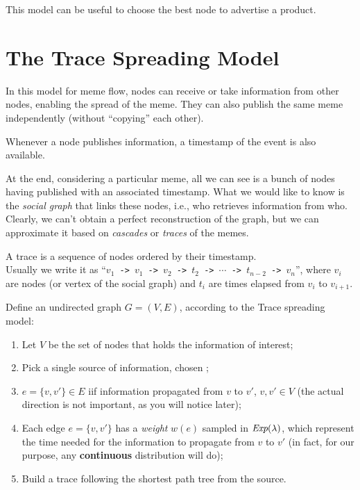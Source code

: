This model can be useful to choose the best node to advertise a product.

\section{The Trace Spreading Model}

In this model for meme flow, nodes can receive or take information from other nodes, enabling the spread of the meme. They can also publish the same meme independently (without ``copying'' each other).

Whenever a node publishes information, a timestamp of the event is also available.

At the end, considering a particular meme, all we can see is a bunch of nodes having published with an associated timestamp. What we would like to know is the \emph{social graph} that links these nodes, i.e., who retrieves information from who. Clearly, we can't obtain a perfect reconstruction of the graph, but we can approximate it based on \textit{cascades} or \textit{traces} of the memes.

\begin{defn}[Trace]
    A trace is a sequence of nodes ordered by their timestamp.\\
    Usually we write it as ``\texttt{$v_1$ -> $v_1$ -> $v_2$ -> $t_2$ -> $\cdots$ -> $t_{n-2}$ -> $v_n$}'', where $v_i$ are nodes (or vertex of the social graph) and $t_i$ are times elapsed from $v_i$ to $v_{i+1}$.
\end{defn}

Define an undirected graph $G = (V, E)$, according to the Trace spreading model: \label{trace-spreading}
\begin{enumerate}
    \item Let $V$ be the set of nodes that holds the information of interest;
    \item Pick a single source of information, chosen \uar;
    \item $e = \{v, v'\} \in E$ iif information propagated from $v$ to $v'$, $v, v' \in V$ (the actual direction is not important, as you will notice later);
    \item Each edge $e = \{v, v'\}$ has a \emph{weight} $w(e)$ sampled \iid in $\emph{Exp}(\lambda)$, which represent the time needed for the information to propagate from $v$ to $v'$ (in fact, for our purpose, any \textbf{continuous} distribution will do);
    \item Build a trace following the shortest path tree from the source.
\end{enumerate}

